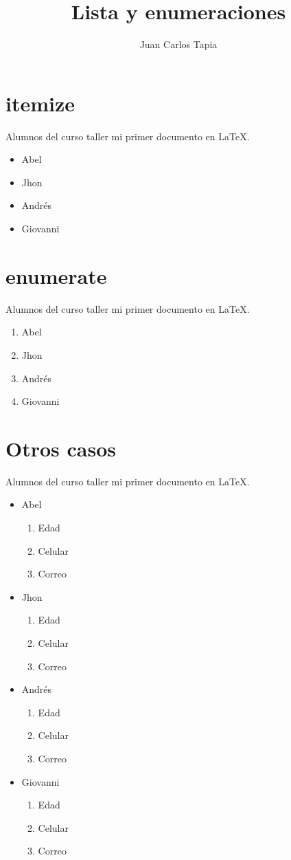 \documentclass[11pt,a4paper]{article}
\author{Juan Carlos Tapia}
\title{Lista y enumeraciones}
\begin{document}
\maketitle
\section{itemize}
Alumnos del curso taller mi primer documento en \LaTeX.
\begin{itemize}
\item Abel
\item Jhon
\item Andrés
\item Giovanni
\end{itemize}


\section{enumerate}
Alumnos del curso taller mi primer documento en \LaTeX.
\begin{enumerate}
\item Abel
\item Jhon
\item Andrés
\item Giovanni
\end{enumerate}

\section{Otros casos}
Alumnos del curso taller mi primer documento en \LaTeX.
\begin{itemize}
\item Abel
\begin{enumerate}
\item Edad
\item Celular
\item Correo
\end{enumerate}
\item Jhon
\begin{enumerate}
\item Edad
\item Celular
\item Correo
\end{enumerate}
\item Andrés
\begin{enumerate}
\item Edad
\item Celular
\item Correo
\end{enumerate}
\item Giovanni
\begin{enumerate}
\item Edad
\item Celular
\item Correo
\end{enumerate}
\end{itemize}
\end{document}

